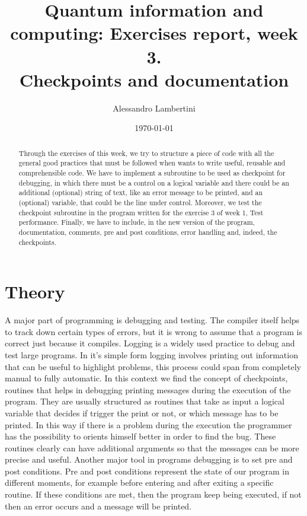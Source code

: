 \documentclass[prb,9pt,notitlepage]{revtex4-1}
\begin{document}
\title{Quantum information and computing: Exercises report, week 3. \\ Checkpoints and documentation }

\author{Alessandro Lambertini}


\date{\today}

\begin{abstract}
Through the exercises of this week, we try to structure a piece of code with all the general good practices that must be followed when wants to write useful, reusable and comprehensible code. We have to implement a subroutine to be used as checkpoint for debugging, in which there must be a control on a logical variable and there could be an additional (optional) string of text, like an error message to be printed, and an (optional) variable, that could be the line under control. Moreover, we test the checkpoint subroutine in the program written for the exercise 3 of week 1, Test performance. Finally, we have to include, in the new version of the program, documentation, comments, pre and post conditions, error handling and, indeed, the checkpoints.
\end{abstract}

\maketitle

\section{Theory}
A major part of programming is debugging and testing. The compiler itself helps to track down certain types of errors, but it is wrong to assume that a program is correct just because it compiles. Logging is a widely used practice to debug and test large programs. In it's simple form logging involves printing out information that can be useful to highlight problems, this process could span from completely manual to fully automatic. In this context we find the concept of checkpoints, routines that helps in debugging printing messages during the execution of the program. They are usually structured as routines that take as input a logical variable that decides if trigger the print or not, or which message has to be printed. In this way if there is a problem during the execution the programmer has the possibility to orients himself better in order to find the bug. These routines clearly can have additional arguments so that the messages can be more precise and useful.
Another major tool in programs debugging is to set pre and post conditions. Pre and post conditions represent the state of our program in different moments, for example before entering and after exiting a specific routine. If these conditions are met, then the program keep being executed, if not then an error occurs and a message will be printed.
\end{document}
